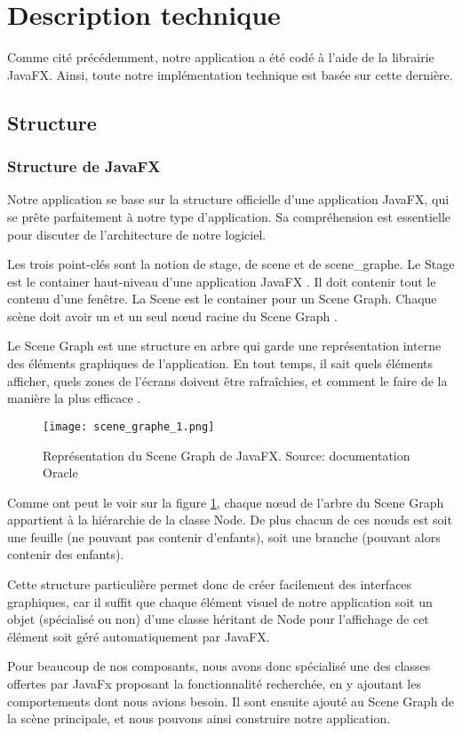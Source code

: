 \section{Description technique}

Comme cité précédemment, notre application a été codé à l'aide de la librairie JavaFX. Ainsi, toute notre implémentation technique est basée sur cette dernière.

\subsection{Structure}
\subsubsection{Structure de JavaFX}
Notre application se base sur la structure officielle d'une application JavaFX, qui se prête parfaitement à notre type d'application. Sa compréhension est essentielle pour discuter de l'architecture de notre logiciel.
\par
Les trois point-clés sont la notion de \gls{stage}, de \gls{scene} et de \gls{scene_graphe}. Le Stage est le container haut-niveau d'une application JavaFX \cite{javadoc_stage}. Il doit contenir tout le contenu d'une fenêtre. La Scene est le container pour un Scene Graph. Chaque scène doit avoir un et un seul nœud racine du Scene Graph \cite{javadoc_scene}.
\par
Le Scene Graph est une structure en arbre qui garde une représentation interne des éléments graphiques de l'application. En tout temps, il sait quels éléments afficher, quels zones de l'écrans doivent être rafraîchies, et comment le faire de la manière la plus efficace \cite{javadoc_scene_graphe}. 	

\begin{figure}[H]
	\caption{Représentation du Scene Graph de JavaFX. Source: documentation Oracle \cite{javadoc_scene_graphe}}
	\centering
	\texttt{[image: scene\_graphe\_1.png]}
	\label{fig:scene_graphe_1}
\end{figure}
Comme ont peut le voir sur la figure \ref{fig:scene_graphe_1}, chaque nœud de l'arbre du Scene Graph appartient à la hiérarchie de la classe Node. De plus chacun de ces nœuds est soit une feuille (ne pouvant pas contenir d'enfants), soit une branche (pouvant alors contenir des enfants).
\par
Cette structure particulière permet donc de créer facilement des interfaces graphiques, car il suffit que chaque élément visuel de notre application soit un objet (spécialisé ou non) d'une classe héritant de Node pour l'affichage de cet élément soit géré automatiquement par JavaFX.
\par
Pour beaucoup de nos composants, nous avons donc spécialisé une des classes offertes par JavaFx proposant la fonctionnalité recherchée, en y ajoutant les comportements dont nous avions besoin. Il sont ensuite ajouté au Scene Graph de la scène principale, et nous pouvons ainsi construire notre application.


